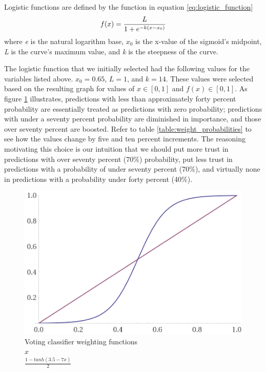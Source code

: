 Logistic functions are defined by the function in equation \ref{eq:logistic_function}
\begin{equation}
    f(x)=\frac{L}{1+e^{-k(x-x_0)}}\\ 
    \label{eq:logistic_function}
\end{equation}
where \textit{e} is the natural logarithm base, \textit{$x_0$} is the x-value of the sigmoid's midpoint, \textit{L} is the curve's maximum value, and \textit{k} is the steepness of the curve.

The logistic function that we initially selected had the following values for the variables listed above. $x_0=0.65$, $L=1$, and $k=14$. These values were selected based on the resulting graph for values of $x \in [0, 1]$ and $f(x) \in [0, 1]$. As figure \ref{graph:weights} illustrates, predictions with less than approximately forty percent probability are essentially treated as predictions with zero probability; predictions with under a seventy percent probability are diminished in importance, and those over seventy percent are boosted. Refer to table \ref{table:weight_probabilities} to see how the values change by five and ten percent increments. The reasoning motivating this choice is our intuition that we should put more trust in predictions with over seventy percent (70\%) probability, put less trust in predictions with a probability of under seventy percent  (70\%), and virtually none in predictions with a probability under forty percent (40\%).

\begin{figure}
  \includegraphics[width=\linewidth]{./images/chapter3/weight_graph}
\caption{\label{graph:weights}Voting classifier weighting functions\\\protect\blueline$x$\\
\protect\redline $\frac{1-tanh(3.5-7x)}{2}$}
\end{figure}

